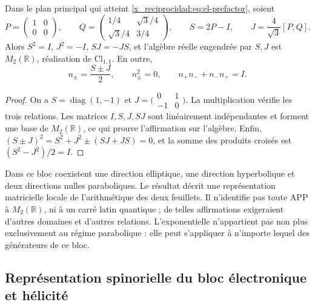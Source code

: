 \begin{proposition}
Dans le plan principal qui atteint \eqref{x_reciprocidad:eq:el-prefactor}, soient
\[
 P=\begin{pmatrix}1&0\\0&0\end{pmatrix},\qquad
 Q=\begin{pmatrix}1/4&\sqrt3/4\\\sqrt3/4&3/4\end{pmatrix},\qquad
 S=2P-I,\qquad J=\frac4{\sqrt3}[P,Q].
\]
Alors \(S^2=I\), \(J^2=-I\), \(SJ=-JS\), et l'algèbre réelle engendrée par \(S,J\) est \(M_2(\mathbb R)\), réalisation de \(\mathrm{Cl}_{1,1}\). En outre,
\[
 n_\pm=\frac{S\pm J}{2},\qquad
 n_\pm^2=0,\qquad n_+n_-+n_-n_+=I.
\]
\end{proposition}
\begin{proof}
On a \(S=\operatorname{diag}(1,-1)\) et
\(J=\bigl(\begin{smallmatrix}0&1\\-1&0\end{smallmatrix}\bigr)\).
La multiplication vérifie les trois relations. Les matrices \(I,S,J,SJ\) sont linéairement indépendantes et forment une base de \(M_2(\mathbb R)\), ce qui prouve l'affirmation sur l'algèbre. Enfin, \((S\pm J)^2=S^2+J^2\pm(SJ+JS)=0\), et la somme des produits croisés est \((S^2-J^2)/2=I\).
\end{proof}

Dans ce bloc coexistent une direction elliptique, une direction hyperbolique et deux
directions nulles paraboliques. Le résultat décrit une représentation
matricielle locale de l'arithmétique des deux feuillets. Il n'identifie pas toute APP
à \(M_2(\mathbb R)\), ni à un carré latin quantique ; de telles
affirmations exigeraient d'autres domaines et d'autres relations. L'exponentielle
n'appartient pas non plus exclusivement au régime parabolique : elle peut
s'appliquer à n'importe lequel des générateurs de ce bloc.


\subsection{Représentation spinorielle du bloc électronique et hélicité}
\label{x_reciprocidad:sec:el-representacion-espinorial}


